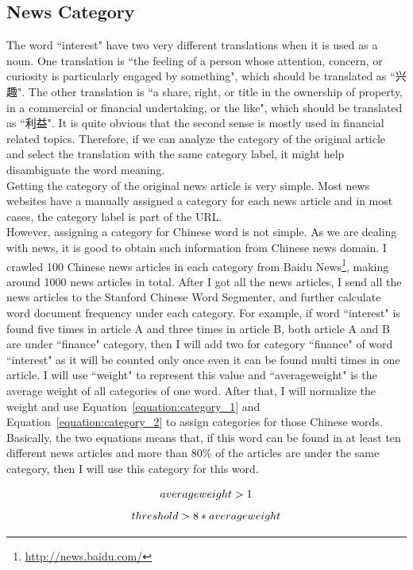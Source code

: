 \begin{CJK}{UTF8}{gbsn}
\subsection{News Category}
The word ``interest" have two very different translations when it is used as a noun. One translation is ``the feeling of a person whose attention, concern, or curiosity is particularly engaged by something", which should be translated as ``兴趣". The other translation is ``a share, right, or title in the ownership of property, in a commercial or financial undertaking, or the like", which should be translated as ``利益". It is quite obvious that the second sense is mostly used in financial related topics. Therefore, if we can analyze the category of the original article and 
select the translation with the same category label, it might help disambiguate the word meaning.
\\
Getting the category of the original news article is very simple. Most news websites have a manually assigned a category for each news article and in most cases, the category label is part of the URL.
\\
However, assigning a category for Chinese word is not simple. As we are dealing with news, it is good to obtain such information from Chinese news domain. I crawled 100 Chinese news articles in each category from  Baidu News\footnote{\url{http://news.baidu.com/}}, making around 1000 news articles in total. After I got all the news articles, I send all the news articles to the Stanford Chinese Word Segmenter, and further calculate word document frequency under each  category. For example, if word ``interest" is found five times in article A and three times in article B, both article A and B are under ``finance" category, then I will add two for category ``finance" of word ``interest" as it will be counted only once even it can be found multi times in one article. I will use ``weight" to represent this value and ``averageweight" is the average weight of all categories of one word. After that, I will normalize the weight and use Equation~\ref{equation:category_1} and Equation~\ref{equation:category_2} to assign categories for those Chinese words. Basically, the two equations means that, if this word can be found in at least ten different news articles and more than 80\% of the articles are under the same category, then I will use this category for this word.

\begin{equation}
averageweight > 1\\
\label{equation:category_1}
\end{equation}
\begin{equation}
threshold > 8 * averageweight\\
\label{equation:category_2}
\end{equation}


\end{CJK}
